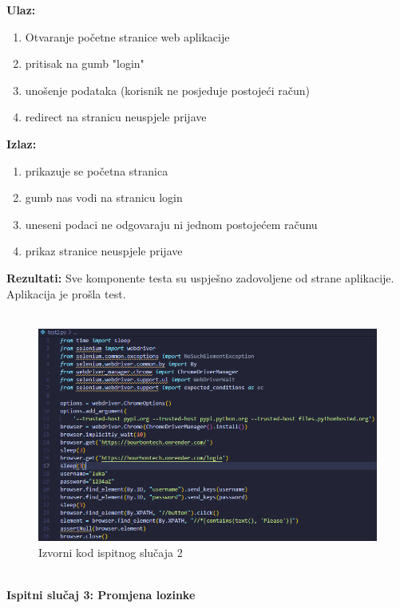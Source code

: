 				\textbf{Ulaz:}
				\begin{enumerate}
					\item Otvaranje početne stranice web aplikacije
					\item pritisak na gumb "login"
					\item unošenje podataka (korisnik ne posjeduje postojeći račun)
					\item redirect na stranicu neuspjele prijave 
				\end{enumerate}
				\textbf{Izlaz:}
				\begin{enumerate}
					\item prikazuje se početna stranica
					\item gumb nas vodi na stranicu login
					\item uneseni podaci ne odgovaraju ni jednom postojećem računu
					\item prikaz stranice neuspjele prijave
				\end{enumerate}
				\textbf{Rezultati:} {Sve komponente testa su uspješno zadovoljene od strane aplikacije. \color{green} Aplikacija je prošla test.}\\\\
			
					\begin{figure}[H]
					\includegraphics[scale=0.4]{dijagrami/test2.png} %
					\centering
					\caption{Izvorni kod ispitnog slučaja 2}
					\label{fig:ispitnislucaj2}
				\end{figure}\\
				
					\textbf{Ispitni slučaj 3: Promjena lozinke}
				
